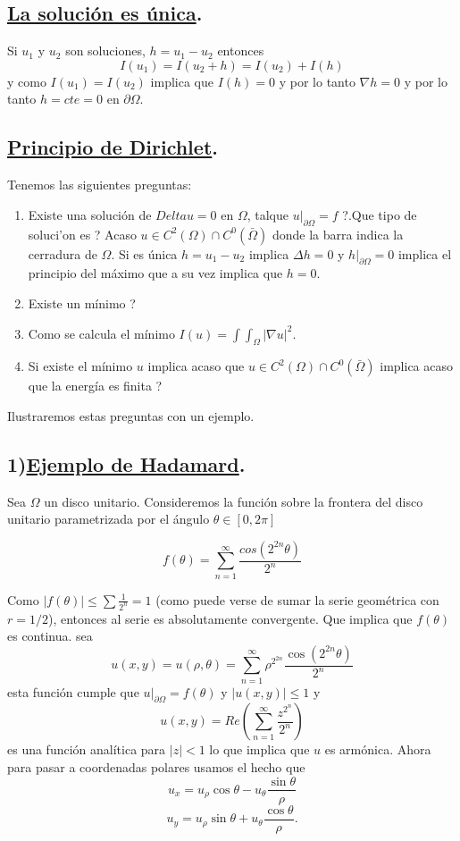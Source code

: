 \documentclass[a4paper,10pt]{book}
\begin{document}
\subsection*{\underline{La soluci\'on es \'unica}.}

Si $u_1$ y $u_2$ son soluciones, $h=u_1-u_2$ entonces
\[I(u_1)=I(u_2+h)=I(u_2)+I(h)\]
y como $I(u_1)=I(u_2)$ implica que $I(h)=0$ y por lo tanto $\nabla h=0$ y por lo tanto 
$h=cte=0$ en $\partial \Omega$.

\subsection*{\underline{Principio de Dirichlet}.}
Tenemos las siguientes preguntas:
\begin{enumerate}
 \item \textquestiondown Existe una soluci\'on de $Delta u=0$ 
en $\Omega$, talque $u|_{\partial \Omega}=f$ ?.\textquestiondown Que tipo de soluci'on es ?
Acaso $u\in C^2 (\Omega) \cap C^0 (\bar{\Omega})$ donde la barra indica la cerradura de $\Omega$.
Si es \'unica  $h=u_1-u_2$ implica $\Delta h=0$ y $h|_{\partial \Omega} =0$ implica el principio
del m\'aximo que a su vez implica que $h=0$.

\item \textquestiondown Existe un m\'inimo ?
\item \textquestiondown Como se calcula el m\'inimo $I(u)=\int \int_{\Omega}  |\nabla u|^2 $.
\item Si existe el m\'inimo $u$ implica acaso que $u\in C^2 (\Omega) \cap C^0 (\bar{\Omega})$ implica 
acaso que la energ\'ia es finita ?
\end{enumerate}

Ilustraremos estas preguntas con un ejemplo. 

\subsection*{1)\underline{Ejemplo de Hadamard}.}

Sea $\Omega $ un disco unitario. Consideremos la funci\'on sobre la frontera del 
disco unitario parametrizada por el \'angulo $\theta\in [0,2\pi]$

\begin{equation}
\label{hadamard}
  f(\theta)=\sum_{n=1}^{\infty} \frac{cos(2^{2n} \theta)}{2^n}
\end{equation}

Como $|f(\theta)|\leq \sum \frac{1}{2^n} =1$ (como puede verse de sumar la serie geom\'etrica con $r=1/2$),
entonces al serie es absolutamente convergente. Que implica que $f(\theta)$ es continua.
sea 
\[u(x,y)=u(\rho,\theta)=\sum_{n=1}^{\infty}  \rho ^{2 ^{2n} } \frac{\cos(2^{2n} \theta)}{2^n}\]
esta funci\'on cumple que $u|_{\partial \Omega}=f(\theta)$  y $|u(x,y)|\leq 1$ y
\[u(x,y)= Re \left( \sum_{n=1}^\infty \frac{z^{2^{n}} }{2^n}\right) \]
es una funci\'on anal\'itica para $|z|<1$  lo que implica que $u$ es arm\'onica. Ahora para pasar a coordenadas
polares usamos el hecho que 
\[u_x=u_\rho \cos \theta - u_{\theta} \frac{\sin \theta}{\rho} \]
\[u_y=u_\rho \sin \theta  + u_{\theta} \frac{\cos \theta}{\rho}.\]
\end{document}
